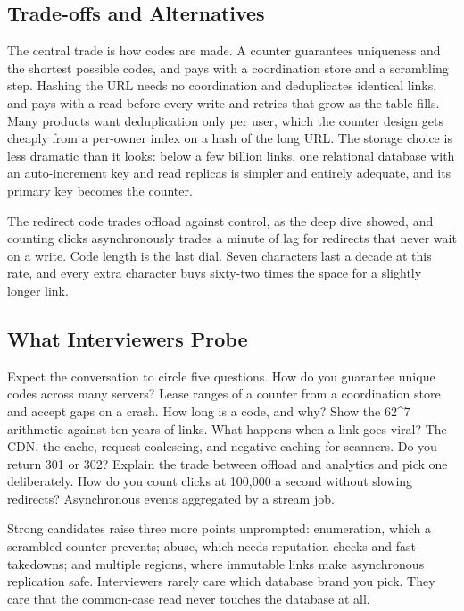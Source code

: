 \documentclass[
  letterpaper,
  oneside,
  11pt,
  openany]{scrbook}
\begin{document}
\subsection{Trade-offs and
Alternatives}\label{trade-offs-and-alternatives}

The central trade is how codes are made. A counter guarantees uniqueness
and the shortest possible codes, and pays with a coordination store and
a scrambling step. Hashing the URL needs no coordination and
deduplicates identical links, and pays with a read before every write
and retries that grow as the table fills. Many products want
deduplication only per user, which the counter design gets cheaply from
a per-owner index on a hash of the long URL. The storage choice is less
dramatic than it looks: below a few billion links, one relational
database with an auto-increment key and read replicas is simpler and
entirely adequate, and its primary key becomes the counter.

The redirect code trades offload against control, as the deep dive
showed, and counting clicks asynchronously trades a minute of lag for
redirects that never wait on a write. Code length is the last dial.
Seven characters last a decade at this rate, and every extra character
buys sixty-two times the space for a slightly longer link.

\subsection{What Interviewers Probe}\label{what-interviewers-probe}

Expect the conversation to circle five questions. How do you guarantee
unique codes across many servers? Lease ranges of a counter from a
coordination store and accept gaps on a crash. How long is a code, and
why? Show the 62\^{}7 arithmetic against ten years of links. What
happens when a link goes viral? The CDN, the cache, request coalescing,
and negative caching for scanners. Do you return 301 or 302? Explain the
trade between offload and analytics and pick one deliberately. How do
you count clicks at 100,000 a second without slowing redirects?
Asynchronous events aggregated by a stream job.

Strong candidates raise three more points unprompted: enumeration, which
a scrambled counter prevents; abuse, which needs reputation checks and
fast takedowns; and multiple regions, where immutable links make
asynchronous replication safe. Interviewers rarely care which database
brand you pick. They care that the common-case read never touches the
database at all.
\end{document}
